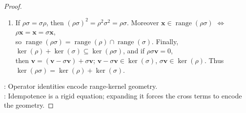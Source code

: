 \begin{theorem}
\begin{proof}
\begin{enumerate}[label=(\roman*)]
Assume $\rho\sigma=\sigma\rho=\sigma$ and set $Q=\rho-\sigma$. Then $Q\mathbf{v}\in\operatorname{range}(\rho)\cap\ker(\sigma)$; $Q\mathbf{x}=\mathbf{x}$, $\mathbf{x}\in\operatorname{range}(\rho)\cap\ker(\sigma)$, so $\operatorname{range}(Q)=\operatorname{range}(\rho)\cap\ker(\sigma)$. Also $Q$ kills both $\ker(\rho)$ and $\operatorname{range}(\sigma)$, and $\ker(\rho)\cap\operatorname{range}(\sigma)=\{\mathbf{0}\}$.\\
If $\mathbf{v}\in\ker(Q)$, then $\rho\mathbf{v}=\sigma\mathbf{v}$ and $\mathbf{v}=(\mathbf{v}-\rho\mathbf{v})+\sigma\mathbf{v} \in\ker(\rho)\oplus\operatorname{range}(\sigma)$. Hence $\ker(Q)=\ker(\rho)\oplus\operatorname{range}(\sigma)$.
\item If $\rho\sigma=\sigma\rho$, then $(\rho\sigma)^2=\rho^2\sigma^2=\rho\sigma$. Moreover $\mathbf{x}\in\operatorname{range}(\rho\sigma)$ $\Longleftrightarrow$ $\rho\mathbf{x}=\mathbf{x}=\sigma\mathbf{x}$,\\
so $\operatorname{range}(\rho\sigma)=\operatorname{range}(\rho)\cap\operatorname{range}(\sigma)$. Finally, $\ker(\rho)+\ker(\sigma)\subseteq\ker(\rho\sigma)$, and if $\rho\sigma\mathbf{v}=0$,\\
then $\mathbf{v}=(\mathbf{v}-\sigma\mathbf{v})+\sigma\mathbf{v}$; $\mathbf{v}-\sigma\mathbf{v}\in\ker(\sigma)$, $\sigma\mathbf{v}\in\ker(\rho)$. Thus $\ker(\rho\sigma)=\ker(\rho)+\ker(\sigma)$.
\end{enumerate}
: Operator identities encode range-kernel geometry.\\
: Idempotence is a rigid equation; expanding it forces the cross terms to encode the geometry.
\end{proof}
\end{theorem}


